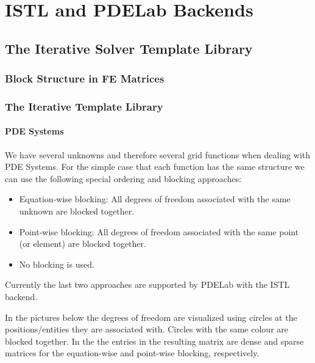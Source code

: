 \section{ISTL and PDELab Backends}
\label{sec:pdelab-backends}


\subsection{The Iterative Solver Template Library}
\label{sec:iter-solv-templ}

\subsubsection{Block Structure in FE Matrices}
\label{sec:motivation}
\begin{frame} \frametitle{The Iterative Template Library}
  \framesubtitle{PDE Systems}
  \begin{block}{}
      We have several unknowns and therefore several grid functions
      when dealing with PDE Systems.
      For the simple case that each function has the same structure we
      can use the following special ordering and blocking approaches:
  \begin{itemize}
  \item Equation-wise blocking: All degrees of freedom associated with
    the same unknown are blocked together.
  \item Point-wise blocking: All degrees of freedom associated with
    the same point (or element) are blocked together.
  \item No blocking is used.
  \end{itemize}
  \end{block}
  Currently the last two approaches are supported by PDELab with the
  ISTL backend.
\end{frame}
In the pictures below the degrees of freedom are visualized using
circles at the positions/entities they are associated with. Circles
with the same colour are blocked together. In the the entries in the
resulting matrix are dense and sparse matrices for the equation-wise
and point-wise blocking, respectively.

